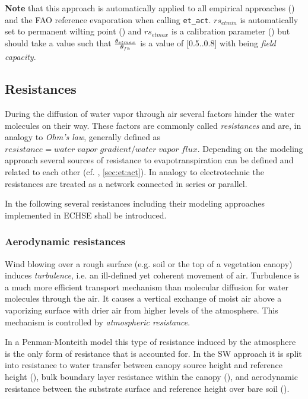 \textbf{Note} that this approach is automatically applied to all empirical approaches () and the FAO reference evaporation when calling \verb!et_act!. $rs_{et min}$ is automatically set to permanent wilting point (\waterContPwp{}) and $rs_{et max}$ is a calibration parameter (\waterContEtmax{}) but should take a value such that $\frac{\theta_{etmax}}{\theta_{fk}}$ is a value of [\num{0.5}..\num{0.8}] with \waterContFK{} being \emph{field capacity}.




\subsection{Resistances} \label{sec:et:resist}
During the diffusion of water vapor through air several factors hinder the water molecules on their way. These factors are commonly called \emph{resistances} and are, in analogy to \emph{Ohm's law}, generally defined as $resistance = water \; vapor \; gradient / water \; vapor \; flux$. Depending on the modeling approach several sources of resistance to evapotranspiration can be defined and related to each other (cf. , \ref{sec:et:act}). In analogy to electrotechnic the resistances are treated as a network connected in series or parallel.

In the following several resistances including their modeling approaches implemented in ECHSE shall be introduced.


\subsubsection{Aerodynamic resistances}
Wind blowing over a rough surface (e.g. soil or the top of a vegetation canopy) induces \emph{turbulence}, i.e. an ill-defined yet coherent movement of air. Turbulence is a much more efficient transport mechanism than molecular diffusion for water molecules through the air. It causes a vertical exchange of moist air above a vaporizing surface with drier air from higher levels of the atmosphere. This mechanism is controlled by \emph{atmospheric resistance}.

In a Penman-Monteith model this type of resistance induced by the atmosphere is the only form of resistance that is accounted for. In the SW approach it is split into resistance to water transfer between canopy source height and reference height (\resAero{}), bulk boundary layer resistance within the canopy (\resCA{}), and aerodynamic resistance between the substrate surface and reference height over bare soil (\resSA{}).


